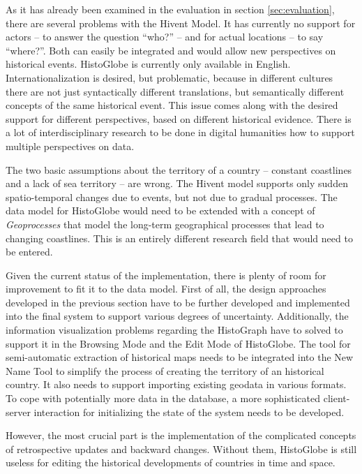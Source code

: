 As it has already been examined in the evaluation in section \ref{sec:evaluation}, there are several problems with the Hivent Model. It has currently no support for actors -- to answer the question ``who?'' -- and for actual locations -- to say ``where?''. Both can easily be integrated and would allow new perspectives on historical events. HistoGlobe is currently only available in English. Internationalization is desired, but problematic, because in different cultures there are not just syntactically different translations, but semantically different concepts of the same historical event. This issue comes along with the desired support for different perspectives, based on different historical evidence. There is a lot of interdisciplinary research to be done in digital humanities how to support multiple perspectives on data.

The two basic assumptions about the territory of a country -- constant coastlines and a lack of sea territory -- are wrong. The Hivent model supports only sudden spatio-temporal changes due to events, but not due to gradual processes. The data model for HistoGlobe would need to be extended with a concept of \emph{Geoprocesses} that model the long-term geographical processes that lead to changing coastlines. This is an entirely different research field that would need to be entered.

Given the current status of the implementation, there is plenty of room for improvement to fit it to the data model. First of all, the design approaches developed in the previous section have to be further developed and implemented into the final system to support various degrees of uncertainty. Additionally, the information visualization problems regarding the HistoGraph have to solved to support it in the Browsing Mode and the Edit Mode of HistoGlobe. The tool for semi-automatic extraction of historical maps needs to be integrated into the New Name Tool to simplify the process of creating the territory of an historical country. It also needs to support importing existing geodata in various formats. To cope with potentially more data in the database, a more sophisticated client-server interaction for initializing the state of the system needs to be developed.

However, the most crucial part is the implementation of the complicated concepts of retrospective updates and backward changes. Without them, HistoGlobe is still useless for editing the historical developments of countries in time and space.

